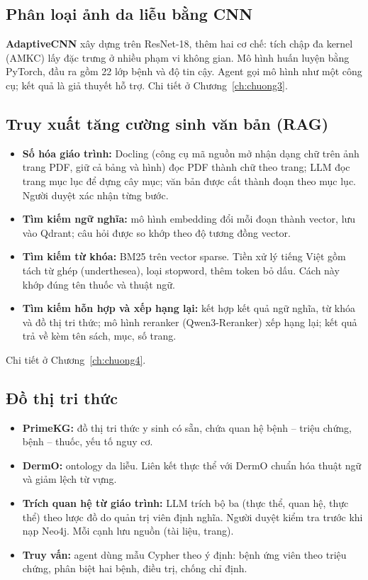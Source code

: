 \subsection{Phân loại ảnh da liễu bằng CNN}

\textbf{AdaptiveCNN} xây dựng trên ResNet-18, thêm hai cơ chế: tích chập đa kernel (AMKC) lấy đặc trưng ở nhiều phạm vi không gian. Mô hình huấn luyện bằng PyTorch, đầu ra gồm 22 lớp bệnh và độ tin cậy. Agent gọi mô hình như một công cụ; kết quả là giả thuyết hỗ trợ. Chi tiết ở Chương~\ref{ch:chuong3}.

\subsection{Truy xuất tăng cường sinh văn bản (RAG)}
\begin{itemize}
  \item \textbf{Số hóa giáo trình:} Docling (công cụ mã nguồn mở nhận dạng chữ trên ảnh trang PDF, giữ cả bảng và hình) đọc PDF thành chữ theo trang; LLM đọc trang mục lục để dựng cây mục; văn bản được cắt thành đoạn theo mục lục. Người duyệt xác nhận từng bước.
  \item \textbf{Tìm kiếm ngữ nghĩa:} mô hình embedding đổi mỗi đoạn thành vector, lưu vào Qdrant; câu hỏi được so khớp theo độ tương đồng vector.
  \item \textbf{Tìm kiếm từ khóa:} BM25 trên vector sparse. Tiền xử lý tiếng Việt gồm tách từ ghép (underthesea), loại stopword, thêm token bỏ dấu. Cách này khớp đúng tên thuốc và thuật ngữ.
  \item \textbf{Tìm kiếm hỗn hợp và xếp hạng lại:} kết hợp kết quả ngữ nghĩa, từ khóa và đồ thị tri thức; mô hình reranker (Qwen3-Reranker) xếp hạng lại; kết quả trả về kèm tên sách, mục, số trang.
\end{itemize}

Chi tiết ở Chương~\ref{ch:chuong4}.

\subsection{Đồ thị tri thức}
\begin{itemize}
  \item \textbf{PrimeKG:} đồ thị tri thức y sinh có sẵn, chứa quan hệ bệnh -- triệu chứng, bệnh -- thuốc, yếu tố nguy cơ.
  \item \textbf{DermO:} ontology da liễu. Liên kết thực thể với DermO chuẩn hóa thuật ngữ và giảm lệch từ vựng.
  \item \textbf{Trích quan hệ từ giáo trình:} LLM trích bộ ba (thực thể, quan hệ, thực thể) theo lược đồ do quản trị viên định nghĩa. Người duyệt kiểm tra trước khi nạp Neo4j. Mỗi cạnh lưu nguồn (tài liệu, trang).
  \item \textbf{Truy vấn:} agent dùng mẫu Cypher theo ý định: bệnh ứng viên theo triệu chứng, phân biệt hai bệnh, điều trị, chống chỉ định.
\end{itemize}


